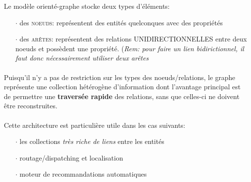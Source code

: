 \item{}
{}
{}


\item{}
{}
{}


\item{}
{}
{}


\item{}
{}
{}


\item{}
{Le modèle orienté-graphe stocke deux types d'éléments:
\begin{itemize}
\item[$\cdot$]des \textcolor{ltred}{\textsc{noeuds}}: représentent des entités quelconques avec des propriétés
\item[$\cdot$]des \textcolor{ltred}{\textsc{arêtes}}: représentent des relations UNIDIRECTIONNELLES entre deux noeuds et possèdent une propriété. (\textit{Rem: pour faire un lien bidirictionnel, il faut donc nécessairement utiliser deux arêtes}
\end{itemize}

\paragraph{}
Puisqu'il n'y a pas de restriction sur les types des noeuds/relations, le graphe représente une collection hétérogène d'information dont l'avantage principal est de permettre une \textbf{traversée rapide} des relations, sans que celles-ci ne doivent être reconstruites.

\paragraph{}
Cette architecture est particulière utile dans les cas suivants:
\begin{itemize}
\item[$\cdot$]les collections \textit{très riche de liens} entre les entités
\item[$\cdot$]routage/dispatching et localisation
\item[$\cdot$]moteur de recommandations automatiques
\end{itemize}
}


